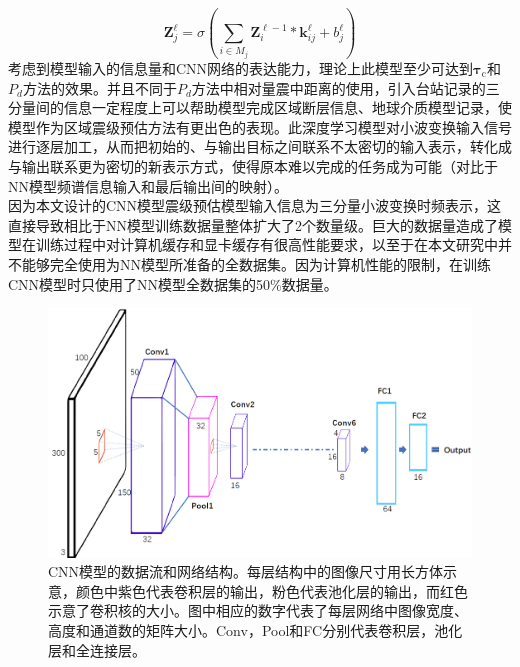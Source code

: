\begin{equation}
\mathbf{Z}_{j}^{\ell}=\sigma\left(\sum_{i \in M_{j}} \mathbf{Z}_{i}^{\ell-1} * \mathbf{k}_{i j}^{\ell}+b_{j}^{\ell}\right)
\end{equation}
\indent 考虑到模型输入的信息量和CNN网络的表达能力，理论上此模型至少可达到$\mathbf{\tau}_{\mathrm{c}}$和$P_{d}$方法的效果。并且不同于$P_{d}$方法中相对量震中距离的使用，引入台站记录的三分量间的信息一定程度上可以帮助模型完成区域断层信息、地球介质模型记录，使模型作为区域震级预估方法有更出色的表现。此深度学习模型对小波变换输入信号进行逐层加工，从而把初始的、与输出目标之间联系不太密切的输入表示，转化成与输出联系更为密切的新表示方式，使得原本难以完成的任务成为可能（对比于NN模型频谱信息输入和最后输出间的映射）。\\
\indent 因为本文设计的CNN模型震级预估模型输入信息为三分量小波变换时频表示，这直接导致相比于NN模型训练数据量整体扩大了2个数量级。巨大的数据量造成了模型在训练过程中对计算机缓存和显卡缓存有很高性能要求，以至于在本文研究中并不能够完全使用为NN模型所准备的全数据集。因为计算机性能的限制，在训练CNN模型时只使用了NN模型全数据集的50\%数据量。\\
 \begin{figure}[!h]%
	\centering  %
	\includegraphics[width=\linewidth]{img/CNN-paper.jpg}  %
	\caption{CNN模型的数据流和网络结构。每层结构中的图像尺寸用长方体示意，颜色中紫色代表卷积层的输出，粉色代表池化层的输出，而红色示意了卷积核的大小。图中相应的数字代表了每层网络中图像宽度、高度和通道数的矩阵大小。Conv，Pool和FC分别代表卷积层，池化层和全连接层。}  %
	\label{fig:mcmthesis-logo}   %
\end{figure}
